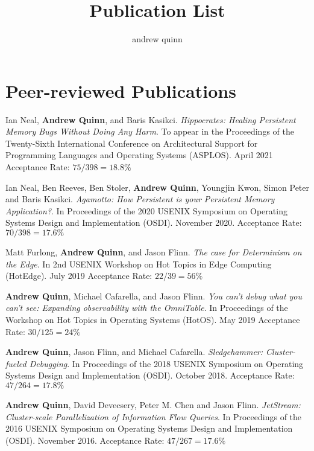 \documentclass[letterpaper,10pt]{article}
\title{Publication List}
\author{andrew quinn}
\newcommand{\paper}[3]{#1. #2 #3}
\begin{document}
\maketitle
\setlength\parindent{0pt}
\setlength{\parskip}{3pt}


\section{Peer-reviewed Publications}
\begin{smenumerate}
  \item \paper{Ian Neal, \textbf{Andrew Quinn}, and Baris
    Kasikci}{\emph{Hippocrates: Healing Persistent Memory Bugs Without Doing Any
      Harm}. To appear in the Proceedings of the Twenty-Sixth International
    Conference on Architectural Support for Programming Languages and Operating
    Systems (ASPLOS). April 2021}{Acceptance Rate: $75/398=18.8\%$}
    
\item \paper{Ian Neal, Ben Reeves, Ben Stoler, \textbf{Andrew Quinn}, Youngjin Kwon,
  Simon Peter and Baris Kasikci}{\emph{Agamotto: How Persistent is your
    Persistent Memory Application?}.  In Proceedings of the 2020 USENIX
  Symposium on Operating Systems Design and Implementation (OSDI).  November
  2020.}{Acceptance Rate: $70/398=17.6\%$}

\item \paper{Matt Furlong, \textbf{Andrew Quinn}, and Jason Flinn}
      {\emph{The case for Determinism on the Edge}.  In 2nd USENIX
        Workshop on Hot Topics in Edge Computing (HotEdge).  July
        2019}{Acceptance Rate: $22/39=56\%$}

\item \paper{\textbf{Andrew Quinn}, Michael Cafarella, and Jason
  Flinn}{\emph{You can't debug what you can't see: Expanding
    observability with the OmniTable}. In Proceedings of the Workshop
  on Hot Topics in Operating Systems (HotOS).  May 2019}{Acceptance
  Rate: $30/125=24\%$}

\item \paper{\textbf{Andrew Quinn}, Jason Flinn, and Michael Cafarella}{
  \emph{Sledgehammer: Cluster-fueled Debugging}.  In Proceedings of the 2018
  USENIX Symposium on Operating Systems Design and Implementation (OSDI).
  October 2018.}{Acceptance Rate: $47/264 = 17.8\%$}

\item \paper{\textbf{Andrew Quinn}, David Devecsery, Peter M. Chen and Jason
  Flinn}{\emph{JetStream: Cluster-scale Parallelization of Information
  Flow Queries}.  In Proceedings of the 2016 USENIX Symposium on
    Operating Systems Design and Implementation (OSDI). November
  2016.}{Acceptance Rate: $47/267=17.6\%$}
\end{smenumerate}
\end{document}
